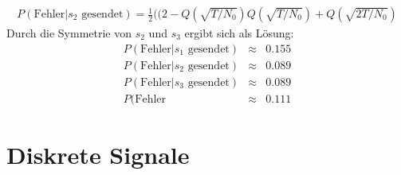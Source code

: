 \begin{eqnarray*}
P(\text{Fehler} \vert s_2 \text{ gesendet}) = \frac{1}{2}((2-Q(\sqrt{T/N_0})Q(\sqrt{T/N_0})+Q(\sqrt{2T/N_0})
\end{eqnarray*}
Durch die Symmetrie von $s_2$ und $s_3$ ergibt sich als Lösung:
\begin{eqnarray*}
P(\text{Fehler} \vert s_1 \text{ gesendet}) &\approx& 0.155 \\
P(\text{Fehler} \vert s_2 \text{ gesendet}) &\approx& 0.089 \\
P(\text{Fehler} \vert s_3 \text{ gesendet}) &\approx& 0.089 \\
P(\text{Fehler} &\approx& 0.111
\end{eqnarray*}
\section{Diskrete Signale} 
